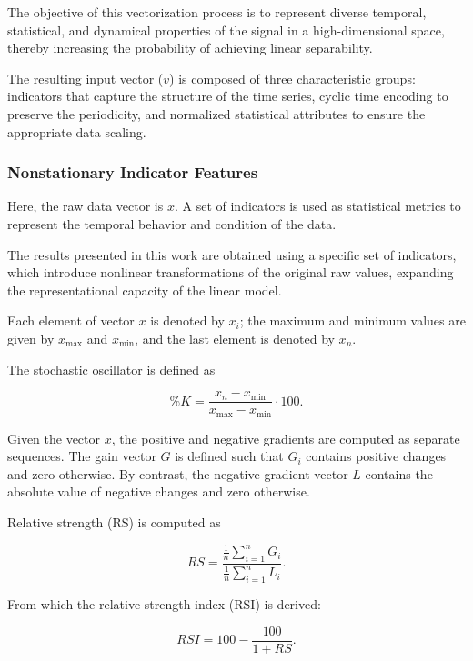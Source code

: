 \documentclass[conference]{IEEEtran}
\begin{document}
The objective of this vectorization process is to represent diverse temporal, statistical, and dynamical properties of the signal in a high-dimensional space, thereby increasing the probability of achieving linear separability.

The resulting input vector ($v$) is composed of three characteristic groups: indicators that capture the structure of the time series, cyclic time encoding to preserve the periodicity, and normalized statistical attributes to ensure the appropriate data scaling.

\subsubsection{Nonstationary Indicator Features}

Here, the raw data vector is $x$. A set of indicators is used as statistical metrics to represent the temporal behavior and condition of the data.

The results presented in this work are obtained using a specific set of indicators, which introduce nonlinear transformations of the original raw values, expanding the representational capacity of the linear model.

Each element of vector $x$ is denoted by $x_i$; the maximum and minimum values are given by $x_{\max}$ and $x_{\min}$, and the last element is denoted by $x_n$.

The stochastic oscillator is defined as

\begin{equation}
\%K = \frac{x_n - x_{\min}}{x_{\max} - x_{\min}} \cdot 100.
\end{equation}

Given the vector $x$, the positive and negative gradients are computed as separate sequences. The gain vector $G$ is defined such that $G_i$ contains positive changes and zero otherwise. By contrast, the negative gradient vector $L$ contains the absolute value of negative changes and zero otherwise.

Relative strength (RS) is computed as

\begin{equation}
RS = \frac{\frac{1}{n} \sum_{i=1}^{n}G_i}{\frac{1}{n} \sum_{i=1}^{n}L_i}.
\end{equation}

From which the relative strength index (RSI) is derived:

\begin{equation}
RSI = 100 - \frac{100}{1 + RS}.
\end{equation}
\end{document}

